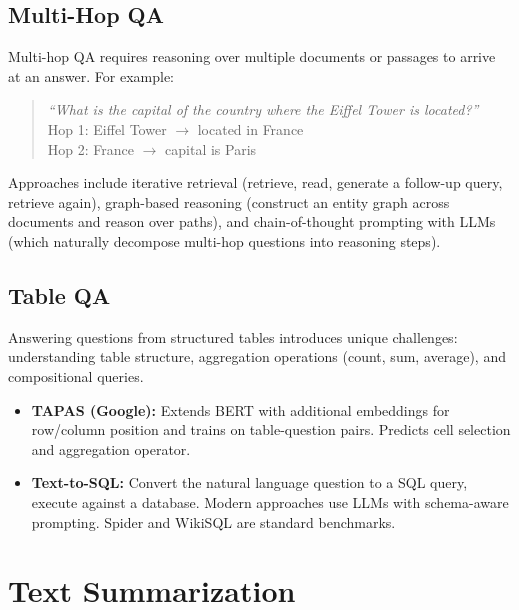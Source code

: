 \subsection{Multi-Hop QA}

Multi-hop QA requires reasoning over multiple documents or passages to arrive at an answer.
For example:

\begin{quote}
\emph{``What is the capital of the country where the Eiffel Tower is located?''} \\
Hop 1: Eiffel Tower $\to$ located in France \\
Hop 2: France $\to$ capital is Paris
\end{quote}

Approaches include iterative retrieval (retrieve, read, generate a follow-up query, retrieve
again), graph-based reasoning (construct an entity graph across documents and reason over
paths), and chain-of-thought prompting with LLMs (which naturally decompose multi-hop
questions into reasoning steps).

\subsection{Table QA}

Answering questions from structured tables introduces unique challenges: understanding table
structure, aggregation operations (count, sum, average), and compositional queries.

\begin{itemize}
    \item \textbf{TAPAS (Google):} Extends BERT with additional embeddings for row/column
          position and trains on table-question pairs.  Predicts cell selection and aggregation
          operator.
    \item \textbf{Text-to-SQL:} Convert the natural language question to a SQL query, execute
          against a database.  Modern approaches use LLMs with schema-aware prompting.
          Spider and WikiSQL are standard benchmarks.
\end{itemize}

\section{Text Summarization}
\label{sec:summarization}


